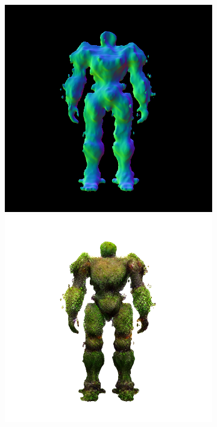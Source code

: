 \begin{figure}[ht]
\begin{subfigure}[b]{0.222\textwidth}
        \includegraphics[width=\textwidth]{etc/a robot made out of plants/magic123/magic123_refine_robot_back_5000_part2.png}
        \includegraphics[width=\textwidth]{etc/a robot made out of plants/magic123/magic123_refine_robot_back_5000_part1.png}

\end{subfigure}
\end{figure}
